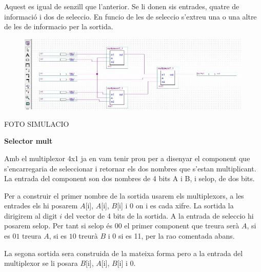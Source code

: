 \documentclass[12pt, a4papre]{article}
\begin{document}
	Aquest es igual de senzill que l'anterior. Se li donen sis entrades, quatre de informació i dos de seleccio. En funcio de les de seleccio s'extreu una  o una altre de les de informacio per la sortida.
	
	\begin{center}
		
		\begin{center}
	\begin{figure}[H]
		\begin{center}
		\includegraphics[width=150mm]{multiplexor4_1.jpeg}
		\end{center}
	\end{figure}
	
	\end{center}
		FOTO SIMULACIO
	\end{center}
	
	\textbf{\large{Selector mult}}
	
	Amb el multiplexor 4x1 ja en vam tenir prou per a disenyar el component que s'encarregaria de seleccionar i retornar els dos nombres que s'estan multiplicant. La entrada del component son dos nombres de 4 bits A i B, i selop, de dos bits. 
	
	Per a construir el primer nombre de la sortida usarem els multiplexors, a les entrades els hi posarem $A$[i], $A$[i], $B$[i] i 0 on i es cada xifre. La sortida la dirigirem al digit $i$ del vector de 4 bits de la sortida. A la entrada de seleccio hi posarem selop. Per tant si selop és $00$ el primer component que treura serà $A$, si es $01$ treura $A$, si es $10$ treurà $B$ i 0 si es 11, per la rao comentada abans.
	
	La segona sortida sera construida de la mateixa forma pero a la entrada del multiplexor se li posara $B$[i], $A$[i], $B$[i] i 0.
	
\end{document}
